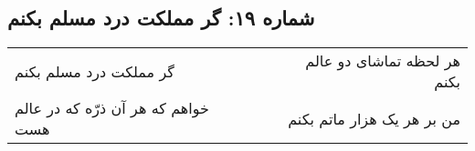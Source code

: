 \begin{center}
\section*{شماره ۱۹: گر مملکت درد مسلم بکنم}
\label{sec:019}
\begin{longtable}{l p{0.5cm} r}
گر مملکت درد مسلم بکنم
&&
هر لحظه تماشای دو عالم بکنم
\\
خواهم که هر آن ذرّه که در عالم هست
&&
من بر هر یک هزار ماتم بکنم
\\
\end{longtable}
\end{center}
